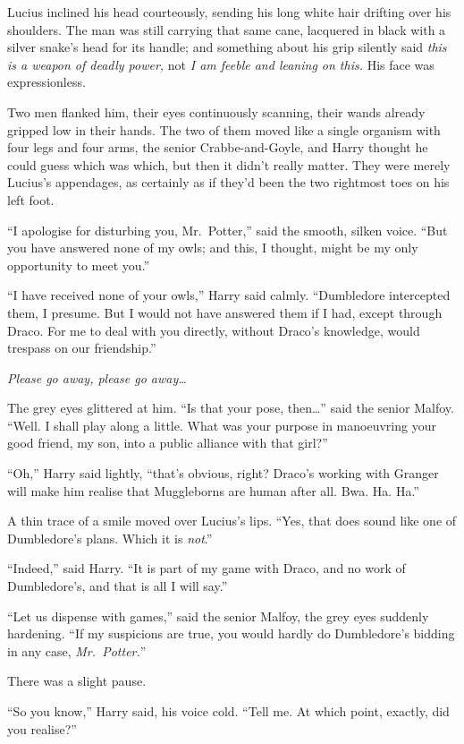 Lucius inclined his head courteously, sending his long white hair
drifting over his shoulders. The man was still carrying that same cane,
lacquered in black with a silver snake's head for its handle; and
something about his grip silently said \emph{this is a weapon of deadly
power,} not \emph{I am feeble and leaning on this.} His face was
expressionless.

Two men flanked him, their eyes continuously scanning, their wands
already gripped low in their hands. The two of them moved like a single
organism with four legs and four arms, the senior Crabbe-and-Goyle, and
Harry thought he could guess which was which, but then it didn't really
matter. They were merely Lucius's appendages, as certainly as if they'd
been the two rightmost toes on his left foot.

``I apologise for disturbing you, Mr.~Potter,'' said the smooth, silken
voice. ``But you have answered none of my owls; and this, I thought,
might be my only opportunity to meet you.''

``I have received none of your owls,'' Harry said calmly. ``Dumbledore
intercepted them, I presume. But I would not have answered them if I
had, except through Draco. For me to deal with you directly, without
Draco's knowledge, would trespass on our friendship.''

\emph{Please go away, please go away\ldots{}}

The grey eyes glittered at him. ``Is that your pose, then\ldots{}'' said
the senior Malfoy. ``Well. I shall play along a little. What was your
purpose in manoeuvring your good friend, my son, into a public alliance
with that girl?''

``Oh,'' Harry said lightly, ``that's obvious, right? Draco's working
with Granger will make him realise that Muggleborns are human after all.
Bwa. Ha. Ha.''

A thin trace of a smile moved over Lucius's lips. ``Yes, that does sound
like one of Dumbledore's plans. Which it is \emph{not}.''

``Indeed,'' said Harry. ``It is part of my game with Draco, and no work
of Dumbledore's, and that is all I will say.''

``Let us dispense with games,'' said the senior Malfoy, the grey eyes
suddenly hardening. ``If my suspicions are true, you would hardly do
Dumbledore's bidding in any case, \emph{Mr.~Potter.}''

There was a slight pause.

``So you know,'' Harry said, his voice cold. ``Tell me. At which point,
exactly, did you realise?''


